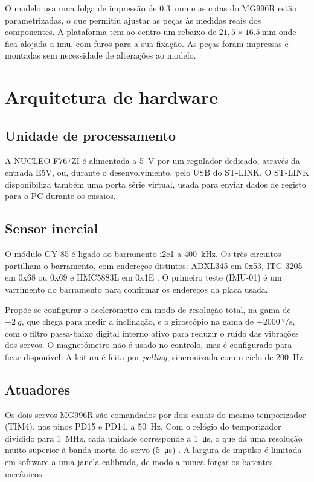 O modelo usa uma folga de impressão de \SI{0.3}{\milli\metre} e as cotas do MG996R estão parametrizadas, o que permitiu ajustar as peças às medidas reais dos componentes. A plataforma tem ao centro um rebaixo de $21{,}5\times\SI{16.5}{\milli\metre}$ onde fica alojada a \gls{imu}, com furos para a sua fixação. As peças foram impressas e montadas sem necessidade de alterações ao modelo.

\section{Arquitetura de hardware}

\subsection{Unidade de processamento}
A NUCLEO-F767ZI é alimentada a \SI{5}{\volt} por um regulador dedicado, através da entrada E5V, ou, durante o desenvolvimento, pelo USB do ST-LINK. O ST-LINK disponibiliza também uma porta série virtual, usada para enviar dados de registo para o PC durante os ensaios.

\subsection{Sensor inercial}
O módulo GY-85 é ligado ao barramento \gls{i2c}1 a \SI{400}{\kilo\hertz}. Os três circuitos partilham o barramento, com endereços distintos: ADXL345 em 0x53, ITG-3205 em 0x68 ou 0x69 e HMC5883L em 0x1E \cite{gy85datasheet}. O primeiro teste (IMU-01) é um varrimento do barramento para confirmar os endereços da placa usada.

Propõe-se configurar o acelerómetro em modo de resolução total, na gama de $\pm\SI{2}{g}$, que chega para medir a inclinação, e o giroscópio na gama de $\pm\SI{2000}{\degree\per\second}$, com o filtro passa-baixo digital interno ativo para reduzir o ruído das vibrações dos servos. O magnetómetro não é usado no controlo, mas é configurado para ficar disponível. A leitura é feita por \textit{polling}, sincronizada com o ciclo de \SI{200}{\hertz}.

\subsection{Atuadores}
Os dois servos MG996R são comandados por dois canais do mesmo temporizador (TIM4), nos pinos PD15 e PD14, a \SI{50}{\hertz}. Com o relógio do temporizador dividido para \SI{1}{\mega\hertz}, cada unidade corresponde a \SI{1}{\micro\second}, o que dá uma resolução muito superior à banda morta do servo (\SI{5}{\micro\second}) \cite{mg996r}. A largura de impulso é limitada em software a uma janela calibrada, de modo a nunca forçar os batentes mecânicos.

